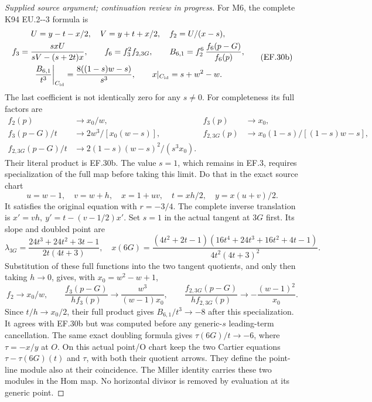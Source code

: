 \begin{proof}[Supplied source argument; continuation review in progress]
For M6, the complete K94 EU.2-\/-3 formula is
\[
 \begin{gathered}
 U=y-t-x/2,\quad V=y+t+x/2,\quad
 f_2=U/(x-s),\\
 f_3=\frac{s xU}{sV-(s+2t)x},\qquad
 f_6=f_3^2 f_{2,3G},\qquad
 B_{6,1}=f_2^6\,\frac{f_6(p-G)}{f_6(p)},\\
 \left.\frac{B_{6,1}}{t^3}\right|_{C_{\rm id}}
             =\frac{8((1-s)w-s)}{s^3},\qquad
 x|_{C_{\rm id}}=s+w^2-w .
 \end{gathered}                                                  \tag{EF.30b}
\]
The last coefficient is not identically zero for any \(s\ne0\).
For completeness its full factors are
\[
 \begin{aligned}
 f_2(p)&\to x_0/w,&f_3(p)&\to x_0,\\
 f_3(p-G)/t&\to2w^3/[x_0(w-s)],&
 f_{2,3G}(p)&\to x_0(1-s)/[(1-s)w-s],\\
 f_{2,3G}(p-G)/t&\to
                  2(1-s)(w-s)^2/(s^3x_0).
 \end{aligned}                                                  \tag{EF.30c}
\]
Their literal product is EF.30b. The value \(s=1\), which remains
in EF.3, requires specialization of the full map before taking this
limit. Do that in the exact source chart
\[
 u=w-1,\quad v=w+h,\quad x=1+uv,\quad
 t=xh/2,\quad y=x(u+v)/2 .
 \tag{EF.30e}
\]
It satisfies the original equation with \(r=-3/4\). The complete
inverse translation is \(x'=vh,\ y'=t-(v-1/2)x'\). Set \(s=1\)
in the actual tangent at \(3G\) first. Its slope and doubled point are
\[
 \lambda_{3G}=\frac{24t^3+24t^2+3t-1}{2t(4t+3)},\quad
 x(6G)=
 \frac{(4t^2+2t-1)(16t^4+24t^3+16t^2+4t-1)}
      {4t^2(4t+3)^2}.
 \tag{EF.30f}
\]
Substitution of these full functions into the two tangent quotients,
and only then taking \(h\to0\), gives, with \(x_0=w^2-w+1\),
\[
 f_2\longrightarrow x_0/w,\qquad
 \frac{f_3(p-G)}{h f_3(p)}
       \longrightarrow\frac{w^3}{(w-1)x_0},\qquad
 \frac{f_{2,3G}(p-G)}{h f_{2,3G}(p)}
       \longrightarrow-\frac{(w-1)^2}{x_0}.
 \tag{EF.30g}
\]
Since \(t/h\to x_0/2\), their full product gives
\(B_{6,1}/t^3\to-8\) after this specialization. It agrees with EF.30b
but was computed before any generic-\(s\) leading-term cancellation.
The same exact doubling formula gives
\(\tau(6G)/t\to-6\), where \(\tau=-x/y\) at \(O\). On this actual
point/O chart keep the two Cartier equations
\(\tau-\tau(6G)(t)\) and \(\tau\), with both their quotient arrows.
They define the point-line module also at their coincidence. The
Miller identity carries these two modules in the Hom map. No
horizontal divisor is removed by evaluation at its generic point.

\end{proof}
